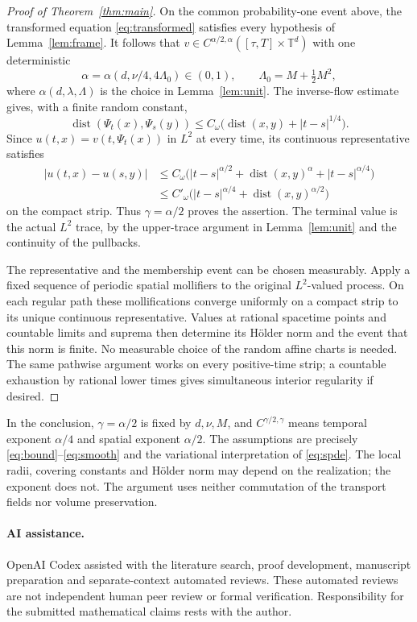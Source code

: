 \documentclass[11pt]{article}
\newcommand{\T}{\mathbb T}
\begin{document}
\begin{proof}[Proof of Theorem~\ref{thm:main}]
On the common probability-one event above, the transformed equation
\eqref{eq:transformed} satisfies every hypothesis of Lemma~\ref{lem:frame}.
It follows that $v\in C^{\alpha/2,\alpha}([\tau,T]\times\T^d)$ with
one deterministic
\[
 \alpha=\alpha(d,\nu/4,4\Lambda_0)\in(0,1),
 \qquad \Lambda_0=M+\tfrac12M^2,
\]
where $\alpha(d,\lambda,\Lambda)$ is the choice in Lemma~\ref{lem:unit}.
The inverse-flow estimate gives, with a finite random constant,
\[
 \operatorname{dist}(\Psi_t(x),\Psi_s(y))
 \le C_\omega\bigl(\operatorname{dist}(x,y)+|t-s|^{1/4}\bigr).
\]
Since $u(t,x)=v(t,\Psi_t(x))$ in $L^2$ at every time, its continuous
representative satisfies
\begin{align*}
 |u(t,x)-u(s,y)|
 &\le C_\omega\bigl(|t-s|^{\alpha/2}
       +\operatorname{dist}(x,y)^\alpha+|t-s|^{\alpha/4}\bigr)\\
 &\le C'_\omega\bigl(|t-s|^{\alpha/4}
       +\operatorname{dist}(x,y)^{\alpha/2}\bigr)
\end{align*}
on the compact strip. Thus $\gamma=\alpha/2$ proves the assertion.
The terminal value is the actual $L^2$ trace, by the upper-trace argument
in Lemma~\ref{lem:unit} and the continuity of the pullbacks.

The representative and the membership event can be chosen measurably.
Apply a fixed sequence of periodic spatial mollifiers to the original
$L^2$-valued process. On each regular path these mollifications converge
uniformly on a compact strip to its unique continuous representative.
Values at rational spacetime points and countable limits and suprema
then determine its H\"older norm and the event that this norm is finite.
No measurable choice of the random affine charts is needed.
The same pathwise argument works on every positive-time strip; a
countable exhaustion by rational lower times gives simultaneous interior
regularity if desired.
\end{proof}

In the conclusion, $\gamma=\alpha/2$ is fixed by $d,\nu,M$, and
$C^{\gamma/2,\gamma}$ means temporal exponent $\alpha/4$ and spatial
exponent $\alpha/2$. The assumptions are precisely
\eqref{eq:bound}--\eqref{eq:smooth} and the variational interpretation of
\eqref{eq:spde}. The local radii, covering constants and H\"older norm
may depend on the realization; the exponent does not. The argument uses
neither commutation of the transport fields nor volume preservation.

\paragraph{AI assistance.}
OpenAI Codex assisted with the literature search, proof development,
manuscript preparation and separate-context automated reviews.
These automated reviews are not independent human peer review or formal
verification. Responsibility for the submitted mathematical claims rests
with the author.
\end{document}
